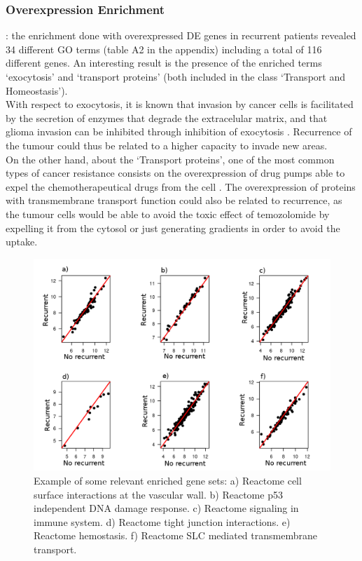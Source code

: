 \documentclass[9pt,twocolumn,twoside]{gsajnl}
\begin{document}
\subsubsection*{Overexpression Enrichment}: the enrichment done with overexpressed DE genes in recurrent patients revealed 34 different GO terms (table A2 in the appendix) including a total of 116 different genes. An interesting result is the presence of the enriched terms `exocytosis' and `transport proteins' (both included in the class `Transport and Homeostasis').\\
With respect to exocytosis, it is known that invasion by cancer cells is facilitated by the secretion of enzymes that degrade the extracelular matrix, and that glioma invasion can be inhibited through inhibition of exocytosis \citep{Liu2012}. Recurrence of the tumour could thus be related to a higher capacity to invade new areas.\\
On the other hand, about the `Transport proteins', one of the most common types of cancer resistance consists on the overexpression of drug pumps able to expel the chemotherapeutical drugs from the cell \citep{Borst2012}. The overexpression of proteins with transmembrane transport function could also be related to recurrence, as the tumour cells would be able to avoid the toxic effect of temozolomide by expelling it from the cytosol or just generating gradients in order to avoid the uptake.
\begin{figure}[!h]
	\centering
	\includegraphics[scale=0.4]{gsea.png}
	\caption{ Example of some relevant enriched gene sets: a) Reactome cell surface interactions at the vascular wall. b) Reactome p53 independent DNA damage response. c) Reactome signaling in immune system. d) Reactome tight junction interactions. e) Reactome hemostasis. f) Reactome SLC mediated transmembrane transport. }
	\label{fig:gsea}
\end{figure}
\end{document}
